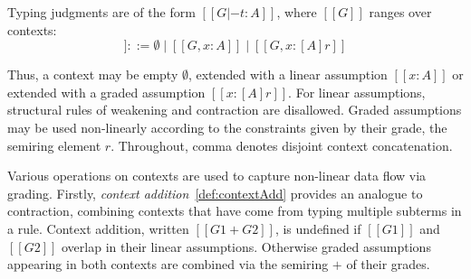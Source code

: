 Typing judgments are of the form $[[ G |- t : A ]]$, where $[[ G ]]$ ranges over contexts:
\begin{equation*}
  [[ G ]] ::= \emptyset
  \mid [[ G , x : A ]]
  \mid [[ G , x : [ A ] r ]]
\tag{contexts}
\end{equation*}

Thus, a context may be empty $\emptyset$, extended with a
linear assumption $[[ x : A ]]$ or extended with a graded assumption $[[x : [A]
r]]$. For linear assumptions, structural rules of weakening
and contraction are disallowed. Graded assumptions may be used
non-linearly according to the constraints given by their grade, the
semiring element $r$. Throughout, comma denotes disjoint context
concatenation.

Various operations on contexts are used to capture non-linear data flow
via grading. Firstly, \emph{context addition}~\eqref{def:contextAdd} provides an
analogue to contraction, combining contexts that have come from
typing multiple subterms in a rule.
Context addition, written $[[ G1 + G2]]$, is undefined if $[[ G1 ]]$ and $[[ G2 ]]$
overlap in their linear assumptions. Otherwise graded assumptions appearing
in both contexts are combined via the semiring $+$ of their grades.

